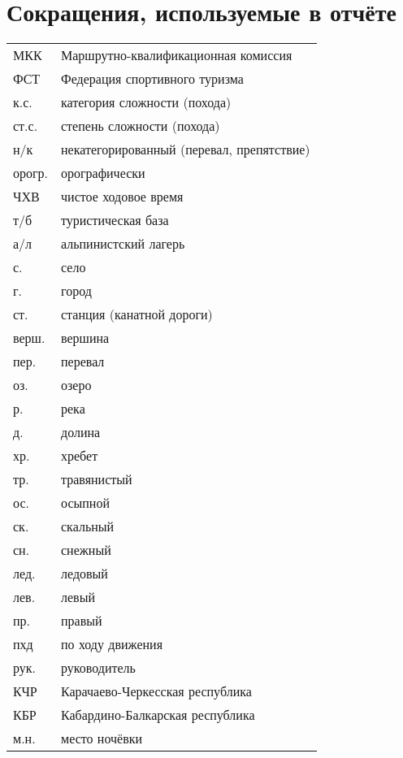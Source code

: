 \section*{Сокращения, используемые в отчёте}
\begin{tabular}{p{} p{}}
	МКК                                  &   Маршрутно-квалификационная комиссия  \\
	ФСТ                                &   Федерация спортивного туризма  \\
	к.с.                               &   категория сложности (похода)  \\
	ст.с.							& степень сложности (похода) \\
	н/к                            &   некатегорированный (перевал, препятствие) \\
	орогр.                &   орографически  \\
	ЧХВ                          &   чистое ходовое время  \\
	т/б                         &   туристическая база \\
	а/л                  &   альпинистский лагерь \\
		с. & село \\
	г. & город \\
	ст. & станция (канатной дороги) \\
	верш.               &   вершина \\
	пер.               &   перевал \\
	оз.             &   озеро \\
	р.             &   река \\
	д.	&	долина\\
	хр. &   хребет \\
	тр. &   травянистый \\
	ос. &   осыпной \\
	ск. &   скальный \\
	сн. &   снежный \\
	лед. &   ледовый \\
	лев. &   левый \\
	пр. &   правый \\
	пхд	&	по ходу движения	\\
	рук. &   руководитель \\	
	КЧР & Карачаево-Черкесская республика\\
	КБР & Кабардино-Балкарская республика\\
	м.н. & место ночёвки
\end{tabular}
\newpage
